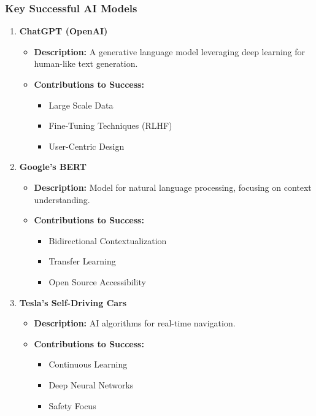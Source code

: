 \documentclass[aspectratio=169]{beamer}
\begin{document}
\begin{frame}[fragile]
    \frametitle{Key Successful AI Models}
    \begin{enumerate}
        \item \textbf{ChatGPT (OpenAI)}
        \begin{itemize}
            \item \textbf{Description:} A generative language model leveraging deep learning for human-like text generation.
            \item \textbf{Contributions to Success:}
            \begin{itemize}
                \item Large Scale Data
                \item Fine-Tuning Techniques (RLHF)
                \item User-Centric Design
            \end{itemize}
        \end{itemize}
        
        \item \textbf{Google’s BERT}
        \begin{itemize}
            \item \textbf{Description:} Model for natural language processing, focusing on context understanding.
            \item \textbf{Contributions to Success:}
            \begin{itemize}
                \item Bidirectional Contextualization
                \item Transfer Learning
                \item Open Source Accessibility
            \end{itemize}
        \end{itemize}

        \item \textbf{Tesla's Self-Driving Cars}
        \begin{itemize}
            \item \textbf{Description:} AI algorithms for real-time navigation.
            \item \textbf{Contributions to Success:}
            \begin{itemize}
                \item Continuous Learning
                \item Deep Neural Networks
                \item Safety Focus
            \end{itemize}
        \end{itemize}
    \end{enumerate}
\end{frame}
\end{document}
